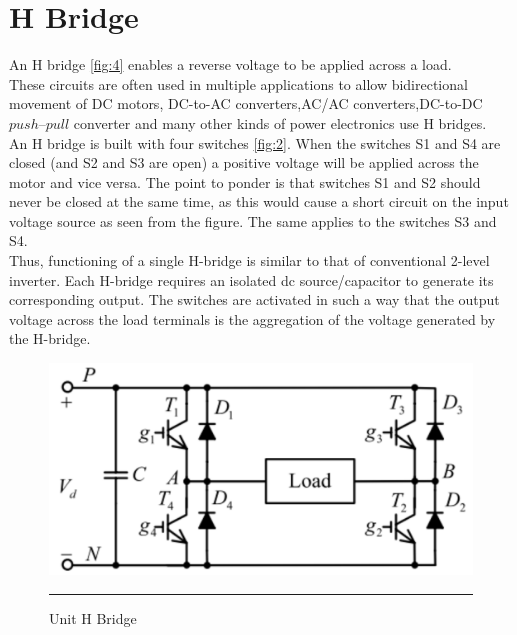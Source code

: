 \section{H Bridge}An H bridge \ref{fig:4} enables a reverse voltage to be applied across a load.\\
These circuits are often used in multiple applications to allow bidirectional movement of DC motors,
DC-to-AC converters,AC/AC converters,DC-to-DC $push–pull$ converter and many other kinds of power electronics use H bridges.\\
 An H bridge is built with four switches \ref{fig:2}. When the switches S1 and S4 are closed (and S2 and S3 are open) a positive voltage will be applied across the motor and vice versa. The point to ponder is that switches S1 and S2 should never be closed at the same time, as this would cause a short circuit on the input voltage source as seen from the figure. The same applies to the switches S3 and S4.\\
 Thus, functioning of a single H-bridge is similar to that of
conventional 2-level inverter. Each H-bridge requires an
isolated dc source/capacitor to generate its corresponding
output. The switches are activated in such a way that the
output voltage across the load terminals is the aggregation
of the voltage generated by the H-bridge.
 
\begin{figure}[htbp]
	\centering
		\includegraphics[width = 5in]{./Figures/h-bridge.pdf}
		\rule{35em}{3pt}
	\caption{Unit H Bridge}
	\label{fig:5}
\end{figure}

